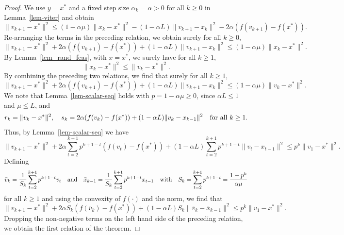 \documentclass{article}
\def\a{\alpha}
\theoremstyle{plain}
\theoremstyle{definition}
\theoremstyle{remark}
\begin{document}
\begin{proof}
    We use $y = x^*$ and a fixed step size $\alpha_k = \alpha > 0$ for all $k \geq 0$ in Lemma~\ref{lem-viter} and obtain
    \[\|v_{k+1} - x^*\|^2 \leq (1-\a \mu) \| x_{k} -x^* \|^2 - (1 - \a L) \| v_{k+1} - x_{k} \|^2 - 2 \a (f(v_{k+1}) - f(x^*)).\]
Re-arranging the terms in the preceding relation, we obtain surely for all $k\ge0,$
\[ \|v_{k+1} - x^*\|^2 +2\a (f(v_{k+1}) - f(x^*)) + (1 - \a L) \| v_{k+1} - x_{k} \|^2
\leq (1-\a \mu) \| x_k -x^*\|^2.\]
By Lemma~\ref{lem_rand_feas}, with $x=x^*$, we surely have for all $k\ge1,$
\[\|x_k-x^*\|^2\le \|v_k-x^*\|^2.\]
By combining the preceding two relations, we find that surely for all $k\ge 1$,
\[ \|v_{k+1} - x^*\|^2 +2\a (f(v_{k+1}) - f(x^*)) + (1 - \a L) \| v_{k+1} - x_{k} \|^2
\leq (1-\a \mu) \| v_k -x^*\|^2.\]
We note that Lemma~\ref{lem-scalar-seq} holds with 
$p=1-\a \mu\ge 0$, since $\a L\le 1$ and $\mu\le L$,
and
\[r_k=\|v_k - x^*\|^2,\quad s_k=2\a (f(v_k) - f(x^*)) + (1-\alpha L) \|v_{k} -x_{k-1} \|^2 \quad\hbox{for all }k\ge1.\]
Thus, by  Lemma~\ref{lem-scalar-seq} we have
\[\|v_{k+1} - x^*\|^2 + 2\a \sum_{t=2}^{k+1} p^{k+1-t} \left(f(v_t) - f(x^*)\right) + (1-\a L) \sum_{t=2}^{k+1} p^{k+1-t} \|v_t - x_{t-1}\|^2 \le p^k \|v_1 - x^*\|^2.\]
Defining
\[\bar v_k=\frac{1}{S_k}\sum_{t=2}^{k+1} p^{k+1-t} v_t \quad\hbox{and} \quad \bar x_{k-1}=\frac{1}{S_k}\sum_{t=2}^{k+1} p^{k+1-t} x_{t-1}
\quad\hbox{with}\quad 
S_k=\sum_{t=2}^{k+1} p^{k+1-t} = \frac{1-p^{k}}{\a \mu}\]
for all $k \geq 1$ and using the convexity of $f(\cdot)$ and the norm, we find that 
\[\|v_{k+1} - x^*\|^2 + 2\a S_k \left(f(\bar v_k)-f(x^*)\right) + (1-\a L) S_k \|\bar v_k - \bar x_{k-1}\|^2 \le p^k \|v_1 - x^*\|^2.\]
Dropping the non-negative terms on the left hand side of the preceding relation, we obtain the first relation of the theorem.


\end{proof}
\end{document}
